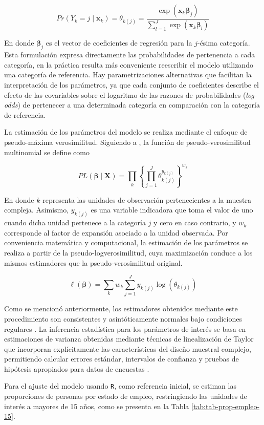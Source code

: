 \documentclass[
  spanish,
  12pt,
]{book}
\begin{document}
\[
Pr(Y_{k} = j \mid \mathbf{x}_{k})
=
\theta_{k(j)}
=
\frac{\exp(\mathbf{x}_{k}\boldsymbol{\beta}_j)}
     {\sum_{l=1}^{J} \exp(\mathbf{x}_{k}\boldsymbol{\beta}_l)}
\]

En donde \(\boldsymbol{\beta}_j\) es el vector de coeficientes de regresión para la \(j\)-ésima categoría. Esta formulación expresa directamente las probabilidades de pertenencia a cada categoría, en la práctica resulta más conveniente reescribir el modelo utilizando una categoría de referencia. Hay parametrizaciones alternativas que facilitan la interpretación de los parámetros, ya que cada conjunto de coeficientes describe el efecto de las covariables sobre el logaritmo de las razones de probabilidades (\emph{log-odds}) de pertenecer a una determinada categoría en comparación con la categoría de referencia.

La estimación de los parámetros del modelo se realiza mediante el enfoque de pseudo-máxima verosimilitud. Siguiendo a \citet{heeringa2017applied}, la función de pseudo-verosimilitud multinomial se define como

\[
PL(\boldsymbol{\beta} \mid \mathbf{X}) =
\prod_{k}
\left\{
\prod_{j=1}^{J}
\theta_{k(j)}^{y_{k(j)}}
\right\}^{w_{k}}
\]

En donde \(k\) representa las unidades de observación pertenecientes a la muestra compleja. Asimismo, \(y_{k(j)}\) es una variable indicadora que toma el valor de uno cuando dicha unidad pertenece a la categoría \(j\) y cero en caso contrario, y \(w_{k}\) corresponde al factor de expansión asociado a la unidad observada. Por conveniencia matemática y computacional, la estimación de los parámetros se realiza a partir de la pseudo-logverosimilitud, cuya maximización conduce a los mismos estimadores que la pseudo-verosimilitud original.

\[
\ell(\boldsymbol{\beta})
=
\sum_{k} w_k
\sum_{j=1}^{J}
y_{k(j)}
\log(\theta_{k(j)})
\]

Como se mencionó anteriormente, los estimadores obtenidos mediante este procedimiento son consistentes y asintóticamente normales bajo condiciones regulares \citep{molina1992pseudo}. La inferencia estadística para los parámetros de interés se basa en estimaciones de varianza obtenidas mediante técnicas de linealización de Taylor que incorporan explícitamente las características del diseño muestral complejo, permitiendo calcular errores estándar, intervalos de confianza y pruebas de hipótesis apropiados para datos de encuestas \citep{binder1983variances}.

Para el ajuste del modelo usando \texttt{R}, como referencia inicial, se estiman las proporciones de personas por estado de empleo, restringiendo las unidades de interés a mayores de 15 años, como se presenta en la Tabla \ref{tab:tab-prop-empleo-15}.
\end{document}
